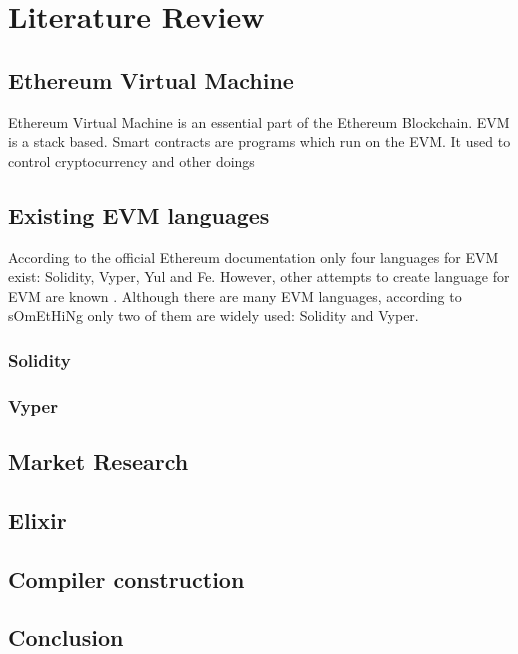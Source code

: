 \chapter{Literature Review}
\label{chap:lr}


\section{Ethereum Virtual Machine}
Ethereum Virtual Machine is an essential part of the Ethereum Blockchain. EVM is a stack based. Smart contracts are programs which run on the EVM. It used to control cryptocurrency and other doings

\section{Existing EVM languages}
According to the official Ethereum documentation \cite{OfficialEthereumLanguages} only four languages for EVM exist: Solidity, Vyper, Yul and Fe. However, other attempts to create language for EVM are known \cite{CommunityEthereumLanguages}. Although there are many EVM languages, according to sOmEtHiNg only two of them are widely used: Solidity and Vyper.
\subsection{Solidity}
\subsection{Vyper}

\section{Market Research}
\section{Elixir}
\section{Compiler construction}
\section{Conclusion}


